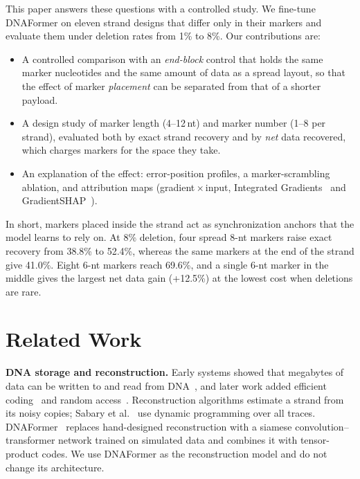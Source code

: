 This paper answers these questions with a controlled study. We fine-tune DNAFormer on eleven strand designs that differ
only in their markers and evaluate them under deletion rates from 1\% to 8\%. Our contributions are:
\begin{itemize}
  \item A controlled comparison with an \emph{end-block} control that holds the same marker nucleotides and the same
        amount of data as a spread layout, so that the effect of marker \emph{placement} can be separated from that of a
        shorter payload.
  \item A design study of marker length (4--12\,nt) and marker number (1--8 per strand), evaluated both by exact strand
        recovery and by \emph{net} data recovered, which charges markers for the space they take.
  \item An explanation of the effect: error-position profiles, a marker-scrambling ablation, and attribution maps
        (gradient\,$\times$\,input, Integrated Gradients~\cite{sundararajan2017} and GradientSHAP~\cite{lundberg2017}).
\end{itemize}
In short, markers placed inside the strand act as synchronization anchors that the model learns to rely on. At 8\%
deletion, four spread 8-nt markers raise exact recovery from 38.8\% to 52.4\%, whereas the same markers at the end of the
strand give 41.0\%. Eight 6-nt markers reach 69.6\%, and a single 6-nt marker in the middle gives the largest net data
gain (+12.5\%) at the lowest cost when deletions are rare.

\section{Related Work}

\textbf{DNA storage and reconstruction.} Early systems showed that megabytes of data can be written to and read from
DNA~\cite{church2012,goldman2013}, and later work added efficient coding~\cite{erlich2017} and random
access~\cite{organick2018}. Reconstruction algorithms estimate a strand from its noisy copies; Sabary et
al.~\cite{sabary2024} use dynamic programming over all traces. DNAFormer~\cite{barlev2025} replaces hand-designed
reconstruction with a siamese convolution--transformer network trained on simulated data and combines it with
tensor-product codes. We use DNAFormer as the reconstruction model and do not change its architecture.

